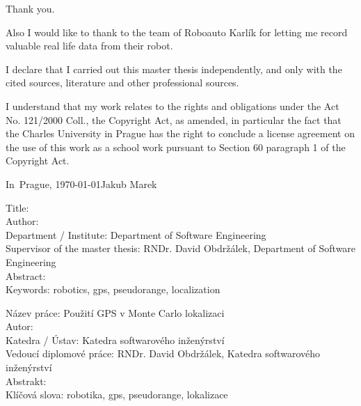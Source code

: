 

\vspace{10mm} 

Thank you.

Also I would like to thank to the team of Roboauto Karlík for letting me
record valuable real life data from their robot.

\cleartorecto

\vspace*{\fill}
I declare that I carried out this master thesis independently, and only with the cited
sources, literature and other professional sources.

I understand that my work relates to the rights and obligations under the Act No.
121/2000 Coll., the Copyright Act, as amended, in particular the fact that the Charles
University in Prague has the right to conclude a license agreement on the use of this
work as a school work pursuant to Section 60 paragraph 1 of the Copyright Act.

\vspace{10mm} 
\noindent In~Prague, \today\hspace{\fill}Jakub Marek\\
\cleartorecto

\tableofcontents*
\cleartorecto

\noindent
Title: \thetitle\\
Author: \theauthor\\
Department / Institute: Department of Software Engineering\\
Supervisor of the master thesis: RNDr. David Obdržálek, Department of Software Engineering\\

\noindent Abstract: \\
\noindent Keywords: robotics, gps, pseudorange, localization

\vspace{25mm}

\noindent
Název práce: Použití GPS v Monte Carlo lokalizaci\\
Autor: \theauthor\\
Katedra / Ústav: Katedra softwarového inženýrství\\
Vedoucí diplomové práce: RNDr. David Obdržálek, Katedra softwarového inženýrství\\

\noindent Abstrakt: \\
\noindent Klíčová slova: robotika, gps, pseudorange, lokalizace

\cleartorecto

